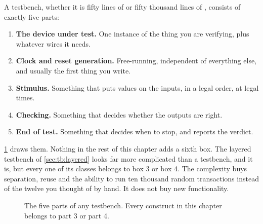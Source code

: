 A testbench, whether it is fifty lines of \VHDL{}
or fifty thousand lines of \SV{}, consists of exactly five parts:

\begin{enumerate}
\item \textbf{The device under test.} One instance of the thing you are
  verifying, plus whatever wires it needs.
\item \textbf{Clock and reset generation.} Free-running, independent of
  everything else, and usually the first thing you write.
\item \textbf{Stimulus.} Something that puts values on the inputs, in a legal
  order, at legal times.
\item \textbf{Checking.} Something that decides whether the outputs are
  right.
\item \textbf{End of test.} Something that decides when to stop, and reports
  the verdict.
\end{enumerate}

\cref{fig:tb:five} draws them. Nothing in the rest of this chapter adds a sixth
box. The layered testbench of \cref{sec:tb:layered} looks far more complicated
than a \VHDL{} testbench, and it is, but every one of its classes belongs to
box 3 or box 4. The complexity buys separation, reuse and the ability to run
ten thousand random transactions instead of the twelve you thought of by hand.
It does not buy new functionality.

\begin{figure}[htbp]
  \centering
  \caption{The five parts of any testbench. Every construct in this chapter
    belongs to part 3 or part 4.}
  \label{fig:tb:five}
\end{figure}

